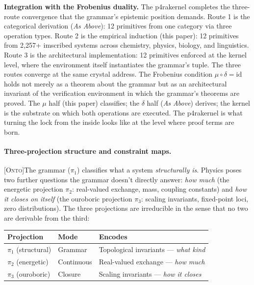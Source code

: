 \documentclass[12pt,a4paper]{article}
\makeatletter
\newcommand{\ONTO}{\textsc{[Onto]}}
\renewcommand{\_}{\ig@origunderscore\discretionary{}{}{}}
\makeatother
\begin{document}
\textbf{Integration with the Frobenius duality.} The p4rakernel completes the three-route convergence that the
grammar's epistemic position demands. Route 1 is the categorical derivation (\emph{As Above}): 12 primitives from one
category via three operation types. Route 2 is the empirical induction (this paper): 12 primitives from 2,257+
imscribed systems across chemistry, physics, biology, and linguistics. Route 3 is the architectural implementation: 12
primitives enforced at the kernel level, where the environment itself instantiates the grammar's tuple. The three
routes converge at the same crystal address. The Frobenius condition $\mu \circ \delta = \text{id}$ holds not merely as
a theorem about the grammar but as an architectural invariant of the verification environment in which the grammar's
theorems are proved. The $\mu$ half (this paper) classifies; the $\delta$ half (\emph{As Above}) derives; the kernel is
the substrate on which both operations are executed. The p4rakernel is what turning the lock from the inside looks like
at the level where proof terms are born.


\paragraph{Three-projection structure and constraint maps.}
\ONTO\quad The grammar ($\pi_1$) classifies what a system
\emph{structurally is}. Physics poses two further questions the
grammar doesn't directly answer: \emph{how much} (the energetic
projection $\pi_2$: real-valued exchange, mass, coupling constants)
and \emph{how it closes on itself} (the ouroboric projection $\pi_3$:
scaling invariants, fixed-point loci, zero distributions).
The three projections are irreducible in the sense that no two are
derivable from the third:

\begin{center}
\small
\begin{tabular}{llp{5.5cm}}
\toprule
Projection & Mode & Encodes \\
\midrule
$\pi_1$ (structural) & Grammar & Topological invariants --- \emph{what kind} \\
$\pi_2$ (energetic) & Continuous & Real-valued exchange --- \emph{how much} \\
$\pi_3$ (ouroboric) & Closure & Scaling invariants --- \emph{how it closes} \\
\bottomrule
\end{tabular}
\end{center}
\end{document}
